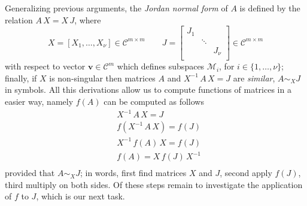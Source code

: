 Generalizing previous arguments, the \textit{Jordan normal form} of $A$ is
defined by the relation $A\,X = X\, J$, where
\begin{displaymath}
X = \left[X_{1},\ldots,X_{\nu} \right]\in\mathcal{C}^{m\times m} \quad\quad
J = \left[ \begin{array}{ccc}
    J_{1} \\
      & \ddots \\
      & & J_{\nu} \\
\end{array} \right] \in\mathcal{C}^{m\times m}
\end{displaymath}
with respect to vector $\boldsymbol{v}\in\mathcal{C}^{m}$ which defines
subspaces $\mathcal{M}_{i}$, for $i\in \lbrace 1,\ldots,\nu \rbrace$; finally,
if $X$ is non-singular then matrices $A$ and $X^{-1}\,A\,X = J$ are
    \textit{similar}, $A \sim_{X} J$ in symbols. All this derivations allow us
    to compute functions of matrices in a easier way, namely $f(A)$ can be
    computed as follows
\begin{displaymath}
\begin{split}
&X^{-1}\,A\,X = J\\
&f(X^{-1}\,A\,X) = f(J)\\
&X^{-1}\,f(A)\,X = f(J)\\
&f(A) = X\,f(J)\,X^{-1}\\
\end{split}
\end{displaymath}
provided that $A \sim_{X} J$; in words, first find matrices $X$ and $J$, second
apply $f(J)$, third multiply on both sides. Of these steps remain to
investigate the application of $f$ to $J$, which is our next task.

